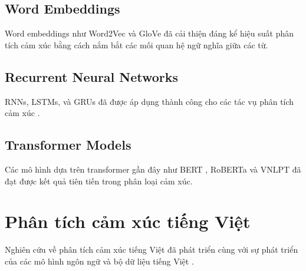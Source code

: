 \subsection{Word Embeddings}

Word embeddings như Word2Vec \cite{mikolov2013distributed} và GloVe \cite{pennington2014glove} đã cải thiện đáng kể hiệu suất phân tích cảm xúc bằng cách nắm bắt các mối quan hệ ngữ nghĩa giữa các từ.

\subsection{Recurrent Neural Networks}

RNNs, LSTMs, và GRUs đã được áp dụng thành công cho các tác vụ phân tích cảm xúc \cite{zhou2016text}.

\subsection{Transformer Models}

Các mô hình dựa trên transformer gần đây như BERT \cite{devlin2018bert}, RoBERTa \cite{liu2019roberta} và VNLPT \cite{van2022vnlp} đã đạt được kết quả tiên tiến trong phân loại cảm xúc.

\section{Phân tích cảm xúc tiếng Việt}

Nghiên cứu về phân tích cảm xúc tiếng Việt đã phát triển cùng với sự phát triển của các mô hình ngôn ngữ và bộ dữ liệu tiếng Việt \cite{van2022vnlp}.
